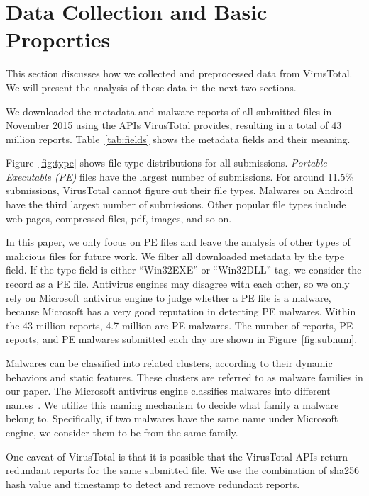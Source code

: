 
\section{Data Collection and Basic Properties}
\label{sec:meth}

This section discusses how we collected and preprocessed data from VirusTotal.
We will present the analysis of these data in the next two sections.



We downloaded the metadata and malware reports of all submitted files in November 2015 using the APIs VirusTotal provides,
resulting in a total of 43 million reports.
Table~\ref{tab:fields} shows the metadata fields and their meaning. 

Figure~\ref{fig:type} shows file type distributions for all submissions. 
{\em Portable Executable (PE)}  files have the largest number of submissions. 
For around 11.5\% submissions, VirusTotal cannot figure out their file types. 
Malwares on Android have the third largest number of submissions.  
Other popular file types include web pages, compressed files, pdf, images, and so on. 

In this paper, we only focus on PE files 
and leave the analysis of other types of malicious files for future work. 
We filter all downloaded metadata by the type field. 
If the type field is either ``Win32EXE'' or ``Win32DLL'' tag, we consider the record as a PE file. 
Antivirus engines may disagree with each other, so
we only rely on Microsoft antivirus engine to judge whether a PE file is a malware, because
Microsoft has a very good reputation in detecting PE malwares. 
Within the 43 million reports, 4.7 million are PE malwares. 
The number of reports, PE reports, and PE malwares submitted each day are shown in Figure~\ref{fig:subnum}.

Malwares can be classified into related clusters, according to their dynamic behaviors and static features. 
These clusters are referred to as malware families in our paper. 
The Microsoft antivirus engine classifies malwares into different names~\cite{microsoft}. 
We utilize this naming mechanism to decide what family a malware belong to.
Specifically, if two malwares have the same name under Microsoft engine, we consider them to be from the same family.

One caveat of VirusTotal is that it is possible that the VirusTotal APIs return redundant reports 
for the same submitted file. 
We use the combination of sha256 hash value and timestamp to detect and remove redundant reports.

